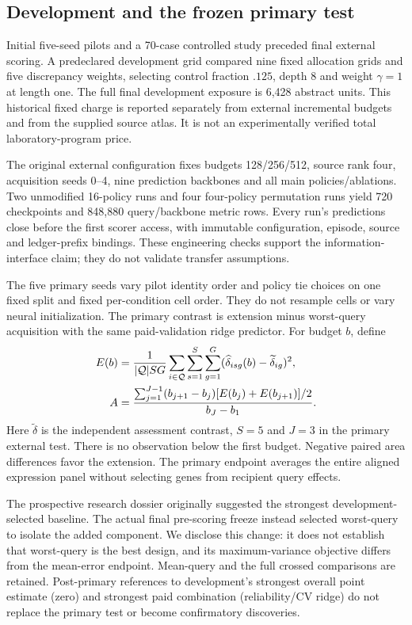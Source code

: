 \subsection{Development and the frozen primary test}
Initial five-seed pilots and a 70-case controlled study preceded final external scoring. A predeclared development grid compared nine fixed allocation grids and five discrepancy weights, selecting control fraction $.125$, depth 8 and weight $\gamma=1$ at length one. The full final development exposure is 6,428 abstract units. This historical fixed charge is reported separately from external incremental budgets and from the supplied source atlas. It is not an experimentally verified total laboratory-program price.

The original external configuration fixes budgets 128/256/512, source rank four, acquisition seeds 0--4, nine prediction backbones and all main policies/ablations. Two unmodified 16-policy runs and four four-policy permutation runs yield 720 checkpoints and 848,880 query/backbone metric rows. Every run's predictions close before the first scorer access, with immutable configuration, episode, source and ledger-prefix bindings. These engineering checks support the information-interface claim; they do not validate transfer assumptions.

The five primary seeds vary pilot identity order and policy tie choices on one fixed split and fixed per-condition cell order. They do not resample cells or vary neural initialization. The primary contrast is extension minus worst-query acquisition with the same paid-validation ridge predictor. For budget $b$, define
\begin{align}
 E(b)&=\frac{1}{|\mathcal Q|SG}\sum_{i\in\mathcal Q}\sum_{s=1}^{S}\sum_{g=1}^{G}
 (\widehat\delta_{isg}(b)-\widetilde\delta_{ig})^2,\notag\\
 A&=\frac{\sum_{j=1}^{J-1}(b_{j+1}-b_j)[E(b_j)+E(b_{j+1})]/2}{b_J-b_1}.
 \label{eq:endpoint}
\end{align}
Here $\widetilde\delta$ is the independent assessment contrast, $S=5$ and $J=3$ in the primary external test. There is no observation below the first budget. Negative paired area differences favor the extension. The primary endpoint averages the entire aligned expression panel without selecting genes from recipient query effects.

The prospective research dossier originally suggested the strongest development-selected baseline. The actual final pre-scoring freeze instead selected worst-query to isolate the added component. We disclose this change: it does not establish that worst-query is the best design, and its maximum-variance objective differs from the mean-error endpoint. Mean-query and the full crossed comparisons are retained. Post-primary references to development's strongest overall point estimate (zero) and strongest paid combination (reliability/CV ridge) do not replace the primary test or become confirmatory discoveries.


